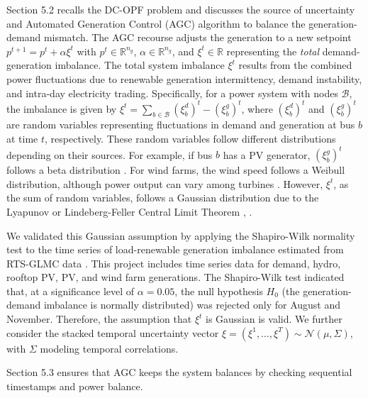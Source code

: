 Section 5.2 recalls the DC-OPF problem and discusses the source of uncertainty and Automated Generation Control (AGC) algorithm to balance the generation-demand mismatch. The AGC recourse adjusts the generation to a new setpoint $p^{t+1} = p^t + \alpha \xi^t$ \cite{roald2017chance,baros2021examining,mezghani2020stochastic} with $p^t \in \mathbb{R}^{n_g}$, $\alpha \in \mathbb{R}^{n_g}$, and $\xi^t \in \mathbb{R}$ representing the \emph{total} demand-generation imbalance.
The total system imbalance $\xi^{t}$ results from the combined power fluctuations due to renewable generation intermittency, demand instability, and intra-day electricity trading. Specifically, for a power system with nodes $\mathcal{B}$, the imbalance is given by $\xi^t = \sum_{b \in \mathcal{B}} (\xi_b^d)^t - (\xi_b^g)^t$, where $(\xi_b^d)^t$ and $(\xi_b^g)^t$ are random variables representing fluctuations in demand and generation at bus $b$ at time $t$, respectively. These random variables follow different distributions depending on their sources. For example, if bus $b$ has a PV generator, $(\xi_b^g)^t$ follows a beta distribution \cite{wang2010probabilistic}. For wind farms, the wind speed follows a Weibull distribution, although power output can vary among turbines \cite{dhople2012framework}. However, $\xi^t$, as the sum of random variables, follows a Gaussian distribution due to the Lyapunov or Lindeberg-Feller Central Limit Theorem \cite{scholz2011central}, \cite{rouaud2013probability, draper2021practical}.

We validated this Gaussian assumption by applying the Shapiro-Wilk normality test \cite{shapiro1965analysis} to the time series of load-renewable generation imbalance estimated from RTS-GLMC data \cite{barrows2019ieee}. This project includes time series data for demand, hydro, rooftop PV, PV, and wind farm generations. The Shapiro-Wilk test indicated that, at a significance level of $\alpha=0.05$, the null hypothesis $H_0$ (the generation-demand imbalance is normally distributed) was rejected only for August and November. Therefore, the assumption that $\xi^t$ is Gaussian is valid.
We further consider the stacked temporal uncertainty vector $\xi = (\xi^1, \dots, \xi^T) \sim \mathcal{N}(\mu, \Sigma)$, with $\Sigma$ modeling temporal correlations.

Section 5.3 ensures that AGC keeps the system balances by checking sequential timestamps and power balance.

